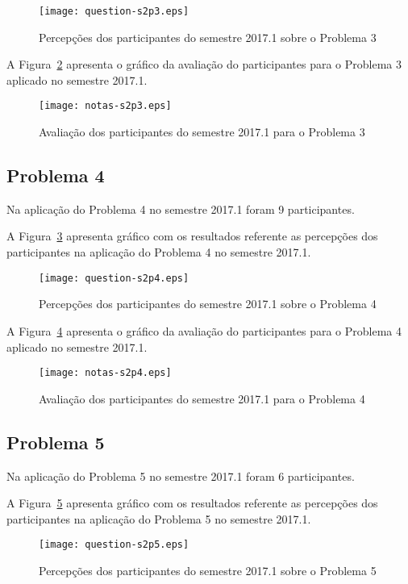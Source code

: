 \begin{figure}[!htb]
\centering
\texttt{[image: question-s2p3.eps]}
\caption{Percepções dos participantes do semestre 2017.1 sobre o Problema 3}
\label{percep-s2p3}
\end{figure}

A Figura~\ref{aval-s2p3} apresenta o gráfico da
avaliação do participantes para o Problema 3 aplicado no semestre 2017.1.

\begin{figure}[!htb]
\centering
\texttt{[image: notas-s2p3.eps]}
\caption{Avaliação dos participantes do semestre 2017.1 para o Problema 3}
\label{aval-s2p3}
\end{figure}

\subsection{Problema 4}
Na aplicação do Problema 4 no semestre 2017.1 foram 9 participantes.

A Figura~\ref{percep-s2p4} apresenta gráfico com os resultados referente
as percepções dos participantes na aplicação do
Problema 4 no semestre 2017.1.

\begin{figure}[!htb]
\centering
\texttt{[image: question-s2p4.eps]}
\caption{Percepções dos participantes do semestre 2017.1 sobre o Problema 4}
\label{percep-s2p4}
\end{figure}

A Figura~\ref{aval-s2p4} apresenta o gráfico da
avaliação do participantes para o Problema 4 aplicado no semestre 2017.1.

\begin{figure}[!htb]
\centering
\texttt{[image: notas-s2p4.eps]}
\caption{Avaliação dos participantes do semestre 2017.1 para o Problema 4}
\label{aval-s2p4}
\end{figure}

\subsection{Problema 5}
Na aplicação do Problema 5 no semestre 2017.1 foram 6 participantes.

A Figura~\ref{percep-s2p5} apresenta gráfico com os resultados referente
as percepções dos participantes na aplicação do
Problema 5 no semestre 2017.1.

\begin{figure}[!htb]
\centering
\texttt{[image: question-s2p5.eps]}
\caption{Percepções dos participantes do semestre 2017.1 sobre o Problema 5}
\label{percep-s2p5}
\end{figure}


